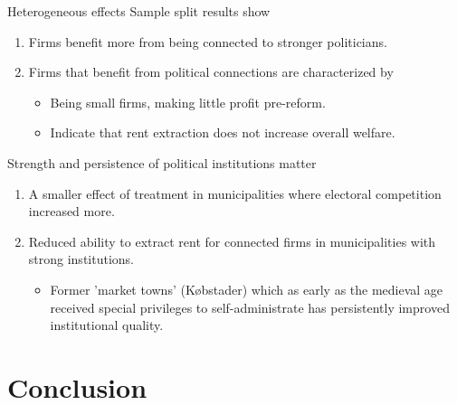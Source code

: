 \documentclass[8pt]{beamer}
\begin{document}
\begin{frame}{Heterogeneous effects}
  Sample split results show
  \begin{enumerate}
    \item Firms benefit more from being connected to stronger politicians.
    \item Firms that benefit from political connections are characterized by
    \begin{itemize}
      \item Being small firms, making little profit pre-reform.
      \item Indicate that rent extraction does not increase overall welfare.
    \end{itemize}
  \end{enumerate}
  Strength and persistence of political institutions matter
  \begin{enumerate}
    \item A smaller effect of treatment in municipalities where electoral competition increased more.
    \item Reduced ability to extract rent for connected firms in municipalities with strong institutions.
    \begin{itemize}
      \item Former 'market towns' (Købstader) which as early as the medieval age received special privileges to self-administrate has persistently improved institutional quality.
    \end{itemize}
  \end{enumerate}
\end{frame}


\section{Conclusion}
\end{document}

